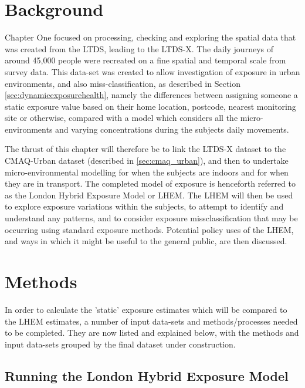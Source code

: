 \section{Background}
\label{sec:exposure_background}

Chapter One focused on processing, checking and exploring the spatial data that was created from the LTDS, leading to the LTDS-X. The daily journeys of around 45,000 people were recreated on a fine spatial and temporal scale from survey data. This data-set was created to allow investigation of exposure in urban environments, and also miss-classification, as described in Section \ref{sec:dynamicexposurehealth}, namely the differences between assigning someone a static exposure value based on their home location, postcode, nearest monitoring site or otherwise, compared with a model which considers all the micro-environments and varying concentrations during the subjects daily movements.

The thrust of this chapter will therefore be to link the LTDS-X dataset to the CMAQ-Urban dataset (described in \ref{sec:cmaq_urban}), and then to undertake micro-environmental modelling for when the subjects are indoors and for when they are in transport. The completed model of exposure is henceforth referred to as the London Hybrid Exposure Model or LHEM. The LHEM will then be used to explore exposure variations within the subjects, to attempt to identify and understand any patterns, and to consider exposure missclassification that may be occurring using standard exposure methods. Potential policy uses of the LHEM, and ways in which it might be useful to the general public, are then discussed.

\section{Methods}
\label{sec:exposure_methods}

In order to calculate the 'static' exposure estimates which will be compared to the LHEM estimates, a number of input data-sets and methods/processes needed to be completed. They are now listed and explained below, with the methods and input data-sets grouped by the final dataset under construction.

    \subsection{Running the London Hybrid Exposure Model}
    \label{sec:running_the_lhem}

